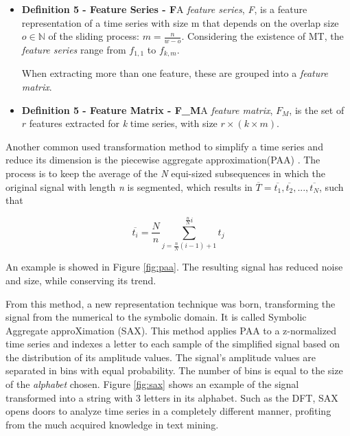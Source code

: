 \begin{itemize}

\item \textbf{Definition 5 - Feature Series - F}A \textit{feature series}, \textit{F}, is a feature representation of a time series with size m that depends on the overlap size $o \in \mathbb{N}$ of the sliding process: $m = \frac{n}{w-o}$. Considering the existence of MT, the \textit{feature series} range from $f_{1,1}$ to $f_{k,m}$.
    
When extracting more than one feature, these are grouped into a \textit{feature matrix}.
    
    \item \textbf{Definition 5 - Feature Matrix - F_M}A \textit{feature matrix}, $F_M$, is the set of $r$ features extracted for \textit{k} time series, with size $r \times (k\times m)$.

\end{itemize}

\par
Another common used transformation method to simplify a time series and reduce its dimension is the piecewise aggregate approximation(PAA) \cite{paa}. The process is to keep the average of the \textit{N} equi-sized subsequences in which the original signal with length \textit{n} is segmented, which results in $\overline{T} = \overline{t_1}, \overline{t_2}, ...,\overline{t_N}$, such that \cite{paa}

\begin{equation}
\overline{t_i} = \frac{N}{n} \sum^{\frac{n}{N}i}_{j=\frac{n}{N}(i-1)+1} t_j
\end{equation}

An example is showed in Figure \ref{fig:paa}. The resulting signal has reduced noise and size, while conserving its trend.
\par
From this method, a new representation technique was born, transforming the signal from the numerical to the symbolic domain. It is called Symbolic Aggregate approXimation (SAX). This method applies PAA to a z-normalized time series and indexes a letter to each sample of the simplified signal based on the distribution of its amplitude values. The signal's amplitude values are separated in bins with equal probability. The number of bins is equal to the size of the \textit{alphabet} chosen. Figure \ref{fig:sax} shows an example of the signal transformed into a string with 3 letters in its alphabet. Such as the DFT, SAX opens doors to analyze time series in a completely different manner, profiting from the much acquired knowledge in text mining.

